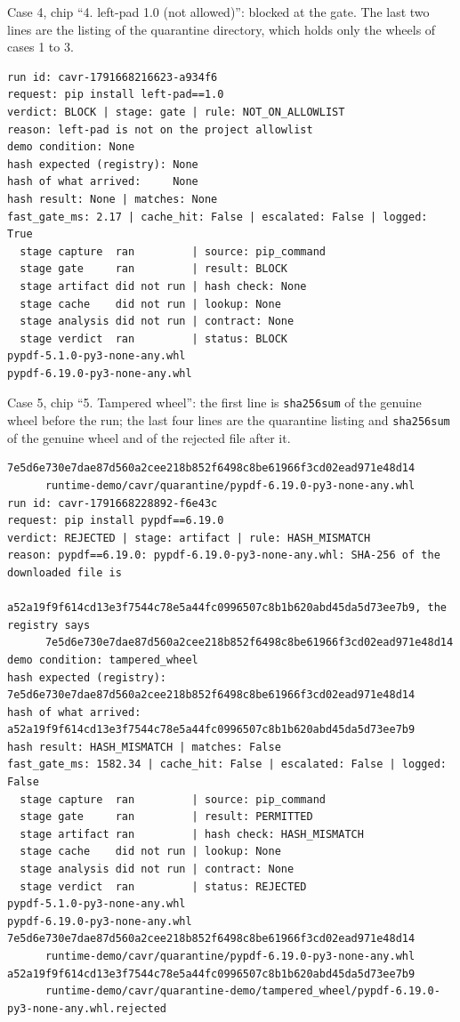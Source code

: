 \noindent Case 4, chip ``4. left-pad 1.0 (not allowed)'': blocked at the gate. The last two lines are the listing of the quarantine directory, which holds only the wheels of cases 1 to 3.
\begin{singlespace}
\scriptsize
\begin{verbatim}
run id: cavr-1791668216623-a934f6
request: pip install left-pad==1.0
verdict: BLOCK | stage: gate | rule: NOT_ON_ALLOWLIST
reason: left-pad is not on the project allowlist
demo condition: None
hash expected (registry): None
hash of what arrived:     None
hash result: None | matches: None
fast_gate_ms: 2.17 | cache_hit: False | escalated: False | logged: True
  stage capture  ran         | source: pip_command
  stage gate     ran         | result: BLOCK
  stage artifact did not run | hash check: None
  stage cache    did not run | lookup: None
  stage analysis did not run | contract: None
  stage verdict  ran         | status: BLOCK
pypdf-5.1.0-py3-none-any.whl
pypdf-6.19.0-py3-none-any.whl
\end{verbatim}
\end{singlespace}

\noindent Case 5, chip ``5. Tampered wheel'': the first line is \texttt{sha256sum} of the genuine wheel before the run; the last four lines are the quarantine listing and \texttt{sha256sum} of the genuine wheel and of the rejected file after it.
\begin{singlespace}
\scriptsize
\begin{verbatim}
7e5d6e730e7dae87d560a2cee218b852f6498c8be61966f3cd02ead971e48d14
      runtime-demo/cavr/quarantine/pypdf-6.19.0-py3-none-any.whl
run id: cavr-1791668228892-f6e43c
request: pip install pypdf==6.19.0
verdict: REJECTED | stage: artifact | rule: HASH_MISMATCH
reason: pypdf==6.19.0: pypdf-6.19.0-py3-none-any.whl: SHA-256 of the downloaded file is
      a52a19f9f614cd13e3f7544c78e5a44fc0996507c8b1b620abd45da5d73ee7b9, the registry says
      7e5d6e730e7dae87d560a2cee218b852f6498c8be61966f3cd02ead971e48d14
demo condition: tampered_wheel
hash expected (registry): 7e5d6e730e7dae87d560a2cee218b852f6498c8be61966f3cd02ead971e48d14
hash of what arrived:     a52a19f9f614cd13e3f7544c78e5a44fc0996507c8b1b620abd45da5d73ee7b9
hash result: HASH_MISMATCH | matches: False
fast_gate_ms: 1582.34 | cache_hit: False | escalated: False | logged: False
  stage capture  ran         | source: pip_command
  stage gate     ran         | result: PERMITTED
  stage artifact ran         | hash check: HASH_MISMATCH
  stage cache    did not run | lookup: None
  stage analysis did not run | contract: None
  stage verdict  ran         | status: REJECTED
pypdf-5.1.0-py3-none-any.whl
pypdf-6.19.0-py3-none-any.whl
7e5d6e730e7dae87d560a2cee218b852f6498c8be61966f3cd02ead971e48d14
      runtime-demo/cavr/quarantine/pypdf-6.19.0-py3-none-any.whl
a52a19f9f614cd13e3f7544c78e5a44fc0996507c8b1b620abd45da5d73ee7b9
      runtime-demo/cavr/quarantine-demo/tampered_wheel/pypdf-6.19.0-py3-none-any.whl.rejected
\end{verbatim}
\end{singlespace}

